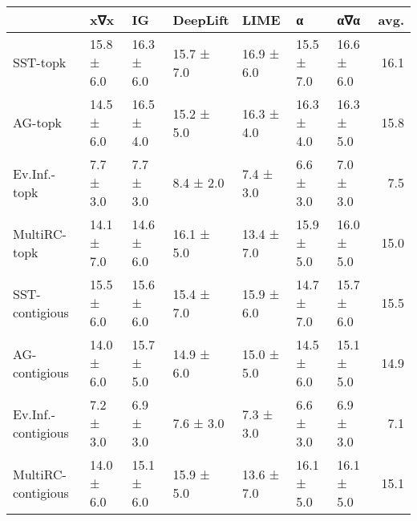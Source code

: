 \begin{tabular}{lllllllr}
\toprule
{} &         x∇x &          IG &    DeepLift &        LIME &           α &         α∇α &  avg. \\
\midrule
SST-topk           &  15.8 ± 6.0 &  16.3 ± 6.0 &  15.7 ± 7.0 &  16.9 ± 6.0 &  15.5 ± 7.0 &  16.6 ± 6.0 &  16.1 \\
AG-topk            &  14.5 ± 6.0 &  16.5 ± 4.0 &  15.2 ± 5.0 &  16.3 ± 4.0 &  16.3 ± 4.0 &  16.3 ± 5.0 &  15.8 \\
Ev.Inf.-topk       &   7.7 ± 3.0 &   7.7 ± 3.0 &   8.4 ± 2.0 &   7.4 ± 3.0 &   6.6 ± 3.0 &   7.0 ± 3.0 &   7.5 \\
MultiRC-topk       &  14.1 ± 7.0 &  14.6 ± 6.0 &  16.1 ± 5.0 &  13.4 ± 7.0 &  15.9 ± 5.0 &  16.0 ± 5.0 &  15.0 \\
SST-contigious     &  15.5 ± 6.0 &  15.6 ± 6.0 &  15.4 ± 7.0 &  15.9 ± 6.0 &  14.7 ± 7.0 &  15.7 ± 6.0 &  15.5 \\
AG-contigious      &  14.0 ± 6.0 &  15.7 ± 5.0 &  14.9 ± 6.0 &  15.0 ± 5.0 &  14.5 ± 6.0 &  15.1 ± 5.0 &  14.9 \\
Ev.Inf.-contigious &   7.2 ± 3.0 &   6.9 ± 3.0 &   7.6 ± 3.0 &   7.3 ± 3.0 &   6.6 ± 3.0 &   6.9 ± 3.0 &   7.1 \\
MultiRC-contigious &  14.0 ± 6.0 &  15.1 ± 6.0 &  15.9 ± 5.0 &  13.6 ± 7.0 &  16.1 ± 5.0 &  16.1 ± 5.0 &  15.1 \\
\bottomrule
\end{tabular}
